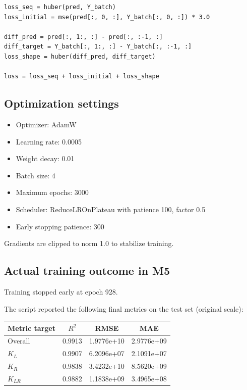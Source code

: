 \documentclass[11pt,a4paper]{article}
\begin{document}
\begin{lstlisting}
loss_seq = huber(pred, Y_batch)
loss_initial = mse(pred[:, 0, :], Y_batch[:, 0, :]) * 3.0

diff_pred = pred[:, 1:, :] - pred[:, :-1, :]
diff_target = Y_batch[:, 1:, :] - Y_batch[:, :-1, :]
loss_shape = huber(diff_pred, diff_target)

loss = loss_seq + loss_initial + loss_shape
\end{lstlisting}

\subsection*{Optimization settings}
\begin{itemize}[nosep]
    \item Optimizer: AdamW
    \item Learning rate: 0.0005
    \item Weight decay: 0.01
    \item Batch size: 4
    \item Maximum epochs: 3000
    \item Scheduler: ReduceLROnPlateau with patience 100, factor 0.5
    \item Early stopping patience: 300
\end{itemize}

Gradients are clipped to norm 1.0 to stabilize training.

\subsection*{Actual training outcome in M5}
Training stopped early at epoch 928.

The script reported the following final metrics on the test set (original scale):

\begin{center}
\begin{tabular}{@{}lccc@{}}
\toprule
Metric target & $R^2$ & RMSE & MAE \\
\midrule
Overall & 0.9913 & 1.9776e+10 & 2.9776e+09 \\
$K_L$ & 0.9907 & 6.2096e+07 & 2.1091e+07 \\
$K_R$ & 0.9838 & 3.4232e+10 & 8.5620e+09 \\
$K_{LR}$ & 0.9882 & 1.1838e+09 & 3.4965e+08 \\
\bottomrule
\end{tabular}
\end{center}
\end{document}
